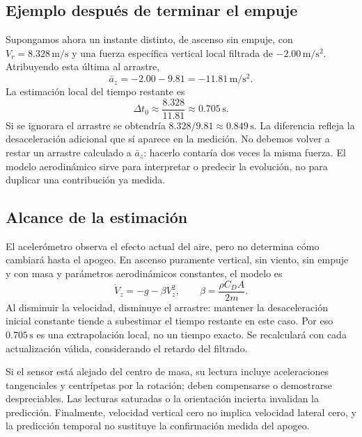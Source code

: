 \subsection{Ejemplo después de terminar el empuje}
Supongamos ahora un instante distinto, de ascenso sin empuje, con $V_r=8.328\,\mathrm{m/s}$ y una fuerza específica vertical local filtrada de $-2.00\,\mathrm{m/s^2}$. Atribuyendo esta última al arrastre,
\begin{equation}
 \bar a_z=-2.00-9.81=-11.81\,\mathrm{m/s^2}.
\end{equation}
La estimación local del tiempo restante es
\begin{equation}
 \Delta t_0\approx\frac{8.328}{11.81}\approx0.705\,\mathrm{s}.
\end{equation}
Si se ignorara el arrastre se obtendría $8.328/9.81\approx0.849\,\mathrm{s}$. La diferencia refleja la desaceleración adicional que sí aparece en la medición. No debemos volver a restar un arrastre calculado a $\bar a_z$: hacerlo contaría dos veces la misma fuerza. El modelo aerodinámico sirve para interpretar o predecir la evolución, no para duplicar una contribución ya medida.

\subsection{Alcance de la estimación}
El acelerómetro observa el efecto actual del aire, pero no determina cómo cambiará hasta el apogeo. En ascenso puramente vertical, sin viento, sin empuje y con masa y parámetros aerodinámicos constantes, el modelo es
\begin{equation}
 \dot V_z=-g-\beta V_z^2,\qquad \beta=\frac{\rho C_D A}{2m}.
\end{equation}
Al disminuir la velocidad, disminuye el arrastre: mantener la desaceleración inicial constante tiende a subestimar el tiempo restante en este caso. Por eso $0.705\,\mathrm{s}$ es una extrapolación local, no un tiempo exacto. Se recalculará con cada actualización válida, considerando el retardo del filtrado.

Si el sensor está alejado del centro de masa, su lectura incluye aceleraciones tangenciales y centrípetas por la rotación; deben compensarse o demostrarse despreciables. Las lecturas saturadas o la orientación incierta invalidan la predicción. Finalmente, velocidad vertical cero no implica velocidad lateral cero, y la predicción temporal no sustituye la confirmación medida del apogeo.

